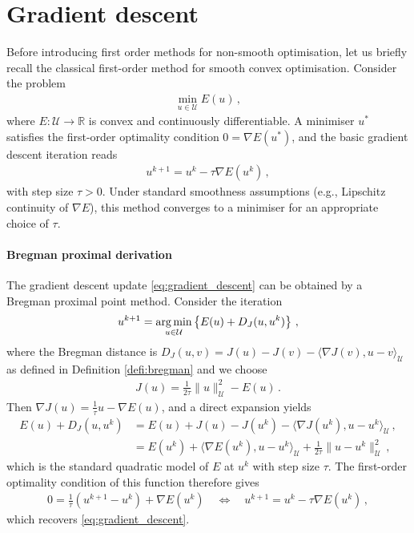 \section{Gradient descent}
Before introducing first order methods for non-smooth optimisation, let us briefly recall the classical first-order method for smooth convex optimisation. Consider the problem
\begin{align}
\min_{u \in \mathcal{U}} E(u) \, , \label{eq:gd_problem}
\end{align}
where $E \colon \mathcal{U} \to \mathbb{R}$ is convex and continuously differentiable. A minimiser $u^*$ satisfies the first-order optimality condition $0 = \nabla E(u^*)$, and the basic gradient descent iteration reads
\begin{align}
u^{k+1} = u^k - \tau \nabla E(u^k) \, , \label{eq:gradient_descent}
\end{align}
with step size $\tau > 0$. Under standard smoothness assumptions (e.g., Lipschitz continuity of $\nabla E$), this method converges to a minimiser for an appropriate choice of $\tau$.

\paragraph{Bregman proximal derivation}
The gradient descent update \eqref{eq:gradient_descent} can be obtained by a Bregman proximal point method. Consider the iteration
\begin{align*}
u^{k+1} = \operatorname*{arg\,min}_{u \in \mathcal{U}} \left\{ E(u) + D_J(u, u^k) \right\} \, ,
\end{align*}
where the Bregman distance is $D_J(u, v) = J(u) - J(v) - \langle \nabla J(v), u - v \rangle_\mathcal{U}$ as defined in Definition \ref{defi:bregman} and we choose
\begin{align*}
J(u) = \frac{1}{2\tau}\|u\|_\mathcal{U}^2 - E(u) \, .
\end{align*}
Then $\nabla J(u) = \frac{1}{\tau}u - \nabla E(u)$, and a direct expansion yields
\begin{align*}
E(u) + D_J(u, u^k)
&= E(u) + J(u) - J(u^k) - \langle \nabla J(u^k), u - u^k \rangle_\mathcal{U} \, , \\
&= E(u^k) + \langle \nabla E(u^k), u - u^k \rangle_\mathcal{U} + \frac{1}{2\tau}\|u - u^k\|_\mathcal{U}^2 \, ,
\end{align*}
which is the standard quadratic model of $E$ at $u^k$ with step size $\tau$. The first-order optimality condition of this function therefore gives
\begin{align*}
0 = \frac{1}{\tau}(u^{k+1} - u^k) + \nabla E(u^k)
\quad \Longleftrightarrow \quad
u^{k+1} = u^k - \tau \nabla E(u^k) \, ,
\end{align*}
which recovers \eqref{eq:gradient_descent}.

